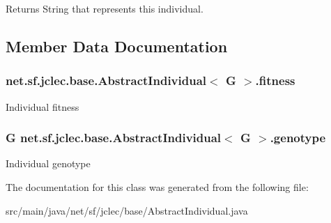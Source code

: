 \begin{DoxyReturn}{Returns}
String that represents this individual. 
\end{DoxyReturn}


\subsection{Member Data Documentation}
\hypertarget{classnet_1_1sf_1_1jclec_1_1base_1_1_abstract_individual_3_01_g_01_4_a333045009734aca2834c6a7fab508fa2}{
\subsubsection[{fitness}]{ net.\-sf.\-jclec.\-base.\-Abstract\-Individual$<$ G $>$.fitness\hspace{0.3cm}{\ttfamily [protected]}}}\label{classnet_1_1sf_1_1jclec_1_1base_1_1_abstract_individual_3_01_g_01_4_a333045009734aca2834c6a7fab508fa2}
Individual fitness \hypertarget{classnet_1_1sf_1_1jclec_1_1base_1_1_abstract_individual_3_01_g_01_4_a17532a6cefcacd7a913749d1f46d798c}{
\subsubsection[{genotype}]{\setlength{\rightskip}{0pt plus 5cm}G net.\-sf.\-jclec.\-base.\-Abstract\-Individual$<$ G $>$.genotype\hspace{0.3cm}{\ttfamily [protected]}}}\label{classnet_1_1sf_1_1jclec_1_1base_1_1_abstract_individual_3_01_g_01_4_a17532a6cefcacd7a913749d1f46d798c}
Individual genotype 

The documentation for this class was generated from the following file\-:\begin{DoxyCompactItemize}
\item 
src/main/java/net/sf/jclec/base/Abstract\-Individual.\-java\end{DoxyCompactItemize}
